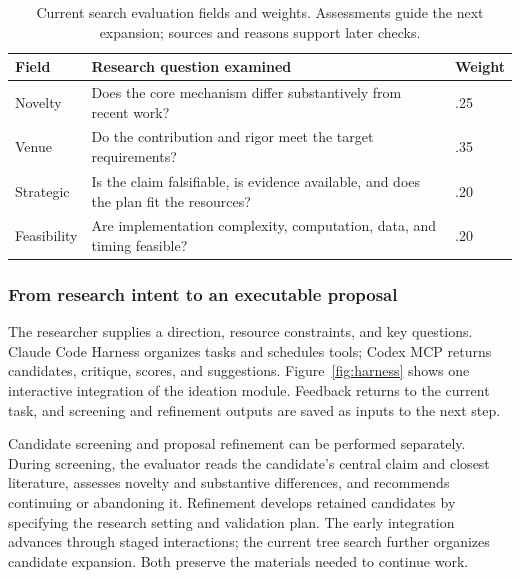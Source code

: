 \begin{table}[H]
\centering\small
\begin{tabularx}{\textwidth}{P{25mm}Y P{16mm}}
\toprule
{}
\textbf{Field} & \textbf{Research question examined} & \textbf{Weight}\\
\midrule
Novelty & Does the core mechanism differ substantively from recent work? & .25\\
Venue & Do the contribution and rigor meet the target requirements? & .35\\
Strategic & Is the claim falsifiable, is evidence available, and does the plan fit the resources? & .20\\
Feasibility & Are implementation complexity, computation, data, and timing feasible? & .20\\
\bottomrule
\end{tabularx}
\caption{Current search evaluation fields and weights. Assessments guide the next expansion; sources and reasons support later checks.}
\label{tab:idea-scores}
\end{table}

\subsubsection{From research intent to an executable proposal}
The researcher supplies a direction, resource constraints, and key questions. Claude Code Harness organizes tasks and schedules tools; Codex MCP returns candidates, critique, scores, and suggestions. Figure~\ref{fig:harness} shows one interactive integration of the ideation module. Feedback returns to the current task, and screening and refinement outputs are saved as inputs to the next step.

\FloatBarrier

Candidate screening and proposal refinement can be performed separately. During screening, the evaluator reads the candidate's central claim and closest literature, assesses novelty and substantive differences, and recommends continuing or abandoning it. Refinement develops retained candidates by specifying the research setting and validation plan. The early integration advances through staged interactions; the current tree search further organizes candidate expansion. Both preserve the materials needed to continue work.

